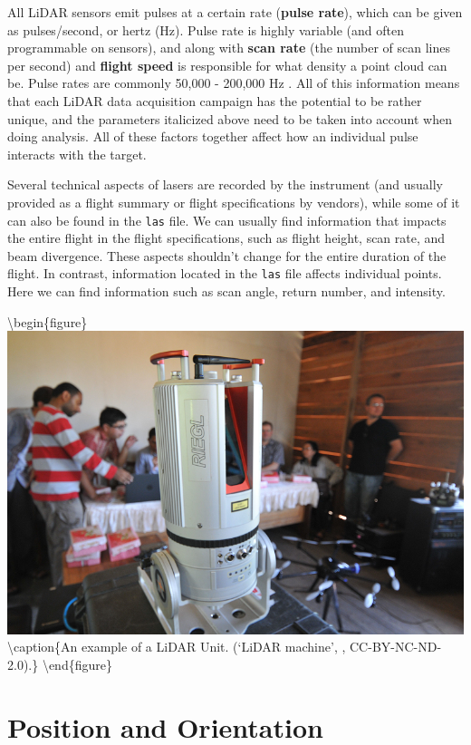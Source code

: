 \documentclass[
]{book}
\begin{document}
All LiDAR sensors emit pulses at a certain rate (\textbf{pulse rate}), which can be given as pulses/second, or hertz (Hz). Pulse rate is highly variable (and often programmable on sensors), and along with \textbf{scan rate} (the number of scan lines per second) and \textbf{flight speed} is responsible for what density a point cloud can be. Pulse rates are commonly 50,000 - 200,000 Hz \citep{white_best_2013}. All of this information means that each LiDAR data acquisition campaign has the potential to be rather unique, and the parameters italicized above need to be taken into account when doing analysis. All of these factors together affect how an individual pulse interacts with the target.

Several technical aspects of lasers are recorded by the instrument (and usually provided as a flight summary or flight specifications by vendors), while some of it can also be found in the \texttt{las} file. We can usually find information that impacts the entire flight in the flight specifications, such as flight height, scan rate, and beam divergence. These aspects shouldn't change for the entire duration of the flight. In contrast, information located in the \texttt{las} file affects individual points. Here we can find information such as scan angle, return number, and intensity.

\textbackslash begin\{figure\}
\includegraphics[width=0.7\linewidth]{images/15-LiDAR-Unit} \textbackslash caption\{An example of a LiDAR Unit. (`LiDAR machine', \citet{the_center_for_international_forestry_research_cifor_lidar_2014}, CC-BY-NC-ND-2.0).\}\label{fig:15-LiDAR-Unit}
\textbackslash end\{figure\}

\hypertarget{position-and-orientation}{%
\section{Position and Orientation}\label{position-and-orientation}}
\end{document}
